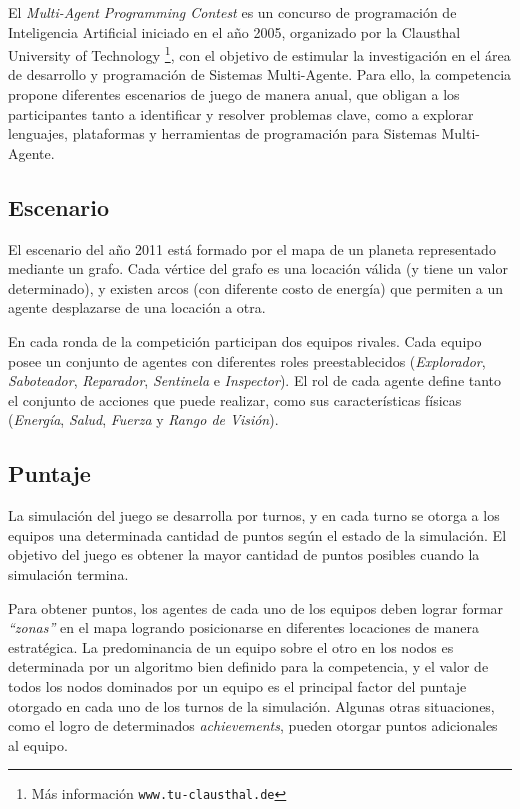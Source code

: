 El \textit{Multi-Agent Programming Contest} es un concurso de programación de Inteligencia Artificial iniciado en el año 2005, organizado por la Clausthal University of Technology 
\footnote{Más información \texttt{www.tu-clausthal.de}}, con el objetivo de estimular la investigación en el área de desarrollo y programación de Sistemas Multi-Agente. Para ello, la competencia propone diferentes escenarios de juego de manera anual, que obligan a los participantes tanto a identificar y resolver problemas clave, como a explorar lenguajes, plataformas y herramientas de programación para Sistemas Multi-Agente.

\subsection{Escenario}

El escenario del año 2011 está formado por el mapa de un planeta representado mediante un grafo. 
Cada vértice del grafo es una locación válida (y tiene un valor determinado), y existen arcos (con diferente costo de energía) que permiten a un agente desplazarse de una locación a otra.

En cada ronda de la competición participan dos equipos rivales. Cada equipo posee un conjunto de agentes con diferentes roles preestablecidos (\textit{Explorador}, \textit{Saboteador}, \textit{Reparador}, \textit{Sentinela} e \textit{Inspector}). El rol de cada agente define tanto el conjunto de acciones que puede realizar, como sus características físicas (\textit{Energía}, \textit{Salud}, \textit{Fuerza} y \textit{Rango de Visión}).

\subsection{Puntaje}

La simulación del juego se desarrolla por turnos, y en cada turno se otorga a los equipos una determinada cantidad de puntos según el estado de la simulación. El objetivo del juego es obtener la mayor cantidad de puntos posibles cuando la simulación termina.

Para obtener puntos, los agentes de cada uno de los equipos deben lograr formar \textit{``zonas''} en el mapa logrando posicionarse en diferentes locaciones de manera estratégica. La predominancia de un equipo sobre el otro en los nodos es determinada por un algoritmo bien definido para la competencia, y el valor de todos los nodos dominados por un equipo es el principal factor del puntaje otorgado en cada uno de los turnos de la simulación. Algunas otras situaciones, como el logro de determinados \textit{achievements}, pueden otorgar puntos adicionales al equipo.


